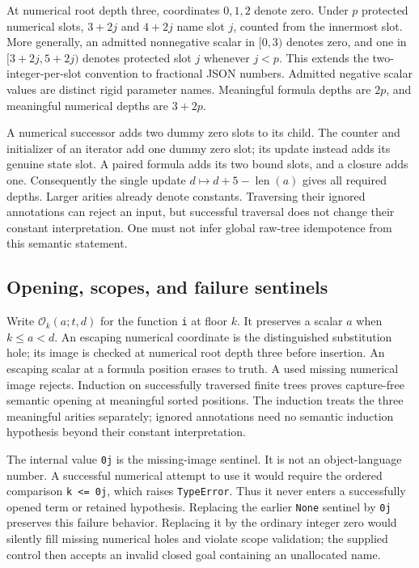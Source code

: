 At numerical root depth three, coordinates $0,1,2$ denote zero. Under
$p$ protected numerical slots, $3+2j$ and $4+2j$ name slot $j$, counted
from the innermost slot. More generally, an admitted nonnegative scalar
in $[0,3)$ denotes zero, and one in $[3+2j,5+2j)$ denotes protected
slot $j$ whenever $j<p$. This extends the two-integer-per-slot convention
to fractional JSON numbers. Admitted negative scalar values are distinct
rigid parameter names. Meaningful formula depths are $2p$, and meaningful
numerical depths are $3+2p$.

A numerical successor adds two dummy zero slots to its child. The
counter and initializer of an iterator add one dummy zero slot; its
update instead adds its genuine state slot. A paired formula adds its
two bound slots, and a closure adds one. Consequently the single update
$d\mapsto d+5-\operatorname{len}(a)$ gives all required depths. Larger
arities already denote constants. Traversing their ignored annotations
can reject an input, but successful traversal does not change their
constant interpretation. One must not infer global raw-tree
idempotence from this semantic statement.

\subsection{Opening, scopes, and failure sentinels}

Write $\mathcal O_k(a;t,d)$ for the function \texttt{i} at floor $k$.
It preserves a scalar $a$ when $k\leq a<d$. An escaping numerical
coordinate is the distinguished substitution hole; its image is checked
at numerical root depth three before insertion. An escaping scalar at
a formula position erases to truth. A used missing numerical image
rejects. Induction on successfully traversed finite trees proves
capture-free semantic opening at meaningful sorted positions. The
induction treats the three meaningful arities separately; ignored
annotations need no semantic induction hypothesis beyond their constant
interpretation.

The internal value \texttt{0j} is the missing-image sentinel. It is not
an object-language number. A successful numerical attempt to use it
would require the ordered comparison \texttt{k <= 0j}, which raises
\texttt{TypeError}. Thus it never enters a successfully opened term or
retained hypothesis. Replacing the earlier \texttt{None} sentinel by
\texttt{0j} preserves this failure behavior. Replacing it by the ordinary
integer zero would silently fill missing numerical holes and violate
scope validation; the supplied control then accepts an invalid closed
goal containing an unallocated name.


